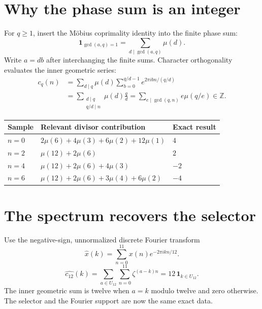 \clearpage\section*{Why the phase sum is an integer}
For $q\geq1$, insert the M\"obius coprimality identity into the finite phase sum:
\[
 \mathbf1_{\gcd(a,q)=1}=\sum_{d\mid\gcd(a,q)}\mu(d).
\]
Write $a=db$ after interchanging the finite sums. Character orthogonality evaluates the inner geometric series:
\[
 \begin{aligned}
 c_q(n)&=\sum_{d\mid q}\mu(d)\sum_{b=0}^{q/d-1}e^{2\pi ibn/(q/d)}\\
 &=\sum_{\substack{d\mid q\\q/d\mid n}}\mu(d)\frac qd
 =\sum_{e\mid\gcd(q,n)}e\mu(q/e)\in\mathbb Z.
 \end{aligned}
\]
\begin{center}
\begin{tabular}{lll}\toprule
Sample & Relevant divisor contribution & Exact result\\\midrule
$n=0$ & $2\mu(6)+4\mu(3)+6\mu(2)+12\mu(1)$ & $4$\\
$n=2$ & $\mu(12)+2\mu(6)$ & $2$\\
$n=4$ & $\mu(12)+2\mu(6)+4\mu(3)$ & $-2$\\
$n=6$ & $\mu(12)+2\mu(6)+3\mu(4)+6\mu(2)$ & $-4$\\\bottomrule
\end{tabular}
\end{center}

\clearpage\section*{The spectrum recovers the selector}
Use the negative-sign, unnormalized discrete Fourier transform
\[
 \widehat x(k)=\sum_{n=0}^{11}x(n)e^{-2\pi ikn/12}.
\]
\[
 \widehat{c_{12}}(k)=\sum_{a\in U_{12}}\sum_{n=0}^{11}\zeta^{(a-k)n}
 =12\,\mathbf1_{k\in U_{12}}.
\]
The inner geometric sum is twelve when $a=k$ modulo twelve and zero otherwise. The selector and the Fourier support are now the same exact data.

